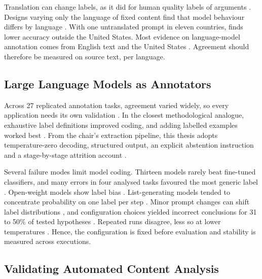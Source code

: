 Translation can change labels, as it did for human quality labels of arguments \parencite[p.~310]{toledoronen2020multilingual}. Designs varying only the language of fixed content find that model behaviour differs by language \parencite{xing2024crosslingualinconsistency,hasan2026englishrewrites,xuan2025mmluprox,liang2025multilingualbehaviour}. With one untranslated prompt in eleven countries, \textcite[p.~1189]{toernberg2025outperform} finds lower accuracy outside the United States. Most evidence on language-model annotation comes from English text and the United States \parencite[p.~1183]{toernberg2025outperform}. Agreement should therefore be measured on source text, per language.

\subsection{Large Language Models as Annotators}\label{subsec:stream_llm}

Across 27 replicated annotation tasks, agreement varied widely, so every application needs its own validation \parencite[p.~1472]{pangakis2025humansintheloop}. In the closest methodological analogue, exhaustive label definitions improved coding, and adding labelled examples worked best \parencite[p.~9]{lupo2024humanlevelcoding}. From the chair's extraction pipeline, this thesis adopts temperature-zero decoding, structured output, an explicit abstention instruction and a stage-by-stage attrition account \parencite{forster2026corporatesustainability}.

Several failure modes limit model coding. Thirteen models rarely beat fine-tuned classifiers, and many errors in four analysed tasks favoured the most generic label \parencite[pp.~259--260]{ziems2024css}. Open-weight models show label bias \parencite[p.~6784]{reif2024labelbias}. List-generating models tended to concentrate probability on one label per step \parencite[p.~2472]{ma2025multilabel}. Minor prompt changes can shift label distributions \parencite{atreja2025whatsinaprompt}, and configuration choices yielded incorrect conclusions for 31 to 50\% of tested hypotheses \parencite{baumann2025llmhacking}. Repeated runs disagree, less so at lower temperatures \parencite{gilardi2023chatgpt}. Hence, the configuration is fixed before evaluation and stability is measured across executions.

\subsection{Validating Automated Content Analysis}\label{subsec:stream_validation}

